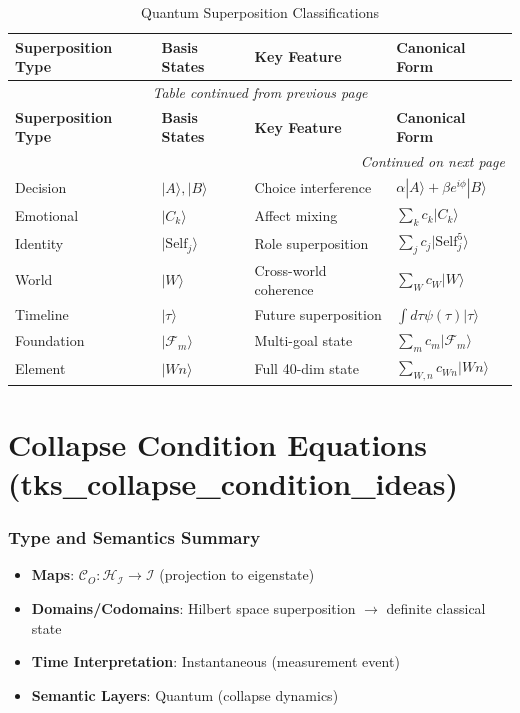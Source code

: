 \documentclass[11pt,twoside]{book}
\renewcommand{\arraystretch}{1.2}  %
\newcommand{\Ideas}{\mathcal{I}}
\newcommand{\Foundations}{\mathcal{F}}
\newcommand{\Collapse}{\mathcal{C}}
\begin{document}
\begin{center}
\small
\renewcommand{\arraystretch}{1.3}
\begin{longtable}{p{2cm}|p{2cm}|p{2cm}|p{3.5cm}}
\caption{Quantum Superposition Classifications} \\
\toprule
\textbf{Superposition Type} & \textbf{Basis States} & \textbf{Key Feature} & \textbf{Canonical Form} \\
\midrule
\endfirsthead
\multicolumn{4}{c}{\textit{Table continued from previous page}} \\
\toprule
\textbf{Superposition Type} & \textbf{Basis States} & \textbf{Key Feature} & \textbf{Canonical Form} \\
\midrule
\endhead
\midrule
\multicolumn{4}{r}{\textit{Continued on next page}} \\
\endfoot
\bottomrule
\endlastfoot
Decision & $|A\rangle, |B\rangle$ & Choice interference & $\alpha|A\rangle + \beta e^{i\phi}|B\rangle$ \\
Emotional & $|C_k\rangle$ & Affect mixing & $\sum_k c_k|C_k\rangle$ \\
Identity & $|\mathrm{Self}_j\rangle$ & Role superposition & $\sum_j c_j|\mathrm{Self}_j^5\rangle$ \\
World & $|W\rangle$ & Cross-world coherence & $\sum_{W} c_W|W\rangle$ \\
Timeline & $|\tau\rangle$ & Future superposition & $\int d\tau \psi(\tau)|\tau\rangle$ \\
Foundation & $|\Foundations_m\rangle$ & Multi-goal state & $\sum_m c_m|\Foundations_m\rangle$ \\
Element & $|Wn\rangle$ & Full 40-dim state & $\sum_{W,n} c_{Wn}|Wn\rangle$ \\
\end{longtable}
\end{center}

\chapter{Collapse Condition Equations (tks\_collapse\_condition\_ideas)}
\label{ch:collapse}

\subsection*{Type and Semantics Summary}
\begin{itemize}
    \item \textbf{Maps}: $\Collapse_O : \mathcal{H}_{\Ideas} \to \Ideas$ (projection to eigenstate)
    \item \textbf{Domains/Codomains}: Hilbert space superposition $\to$ definite classical state
    \item \textbf{Time Interpretation}: Instantaneous (measurement event)
    \item \textbf{Semantic Layers}: Quantum (collapse dynamics)
\end{itemize}
\end{document}
